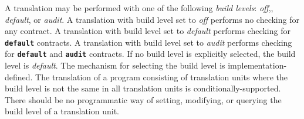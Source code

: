 {\addtolength{\leftskip}{5em}
A translation may be performed with one of the following \emph{build levels}: 
\emph{off},, \emph{default}, or \emph{audit}. 
A translation with build level set to \emph{off}  performs no checking for any contract.
A translation with build level set to \emph{default} performs checking for \textbf{\texttt{default}} contracts. 
A translation with build level set to \emph{audit} performs checking for \textbf{\texttt{default}} and 
\textbf{\texttt{audit}} contracts. 
If no build level is explicitly selected, the build level is \emph{default}. 
The mechanism for selecting the build level is implementation-defined. 
The translation of a program consisting of translation units where the build level is not the same in all translation units is conditionally-supported. 
There should be no programmatic way of setting, modifying, or querying the build level of a translation unit.
}
